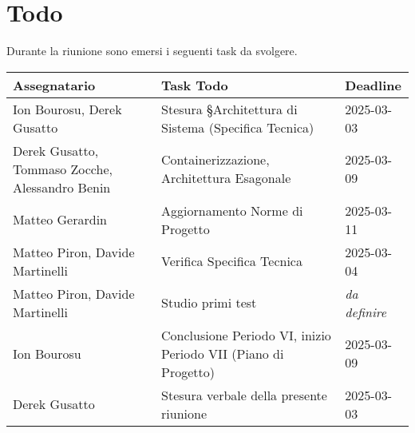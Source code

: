 \section{Todo}
Durante la riunione sono emersi i seguenti task da svolgere.

\begin{center}
  \begin{tabular}{|L{4cm}|L{6cm}|L{3cm}|}
    \hline
    \textbf{Assegnatario} & \textbf{Task Todo} & \textbf{Deadline} \\ \hline
    Ion Bourosu, Derek Gusatto &  Stesura  §Architettura di Sistema (Specifica Tecnica) &  2025-03-03 \\ \hline
    Derek Gusatto, Tommaso Zocche, Alessandro Benin &  Containerizzazione, Architettura Esagonale &  2025-03-09 \\ \hline
    Matteo Gerardin &  Aggiornamento Norme di Progetto &  2025-03-11 \\ \hline
    Matteo Piron, Davide Martinelli &  Verifica Specifica Tecnica &  2025-03-04 \\ \hline
    Matteo Piron, Davide Martinelli &  Studio primi test &  \textit{da definire }\\ \hline
     Ion Bourosu & Conclusione Periodo VI, inizio Periodo VII  (Piano di Progetto)& 2025-03-09 \\ \hline
    Derek Gusatto &  Stesura verbale della presente riunione &  2025-03-03 \\ \hline
  \end{tabular}
\end{center}